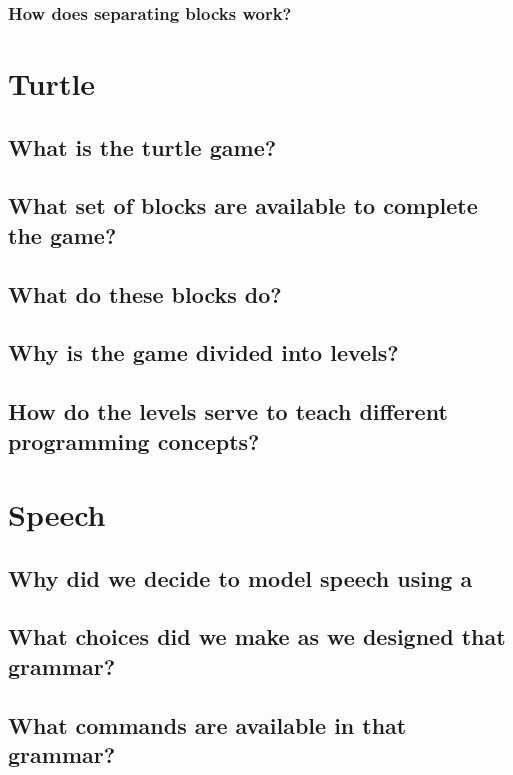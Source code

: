 \documentclass[]{article}
\begin{document}
\subsubsection{How does separating blocks work?}

\section{Turtle}

\subsection{What is the turtle game?}

\subsection{What set of blocks are available to complete the game?}

\subsection{What do these blocks do?}

\subsection{Why is the game divided into levels?}

\subsection{How do the levels serve to teach different programming concepts?}


\section{Speech}

\subsection{Why did we decide to model speech using a} %

\subsection{What choices did we make as we designed that grammar?}

\subsection{What commands are available in that grammar?}
\end{document}
